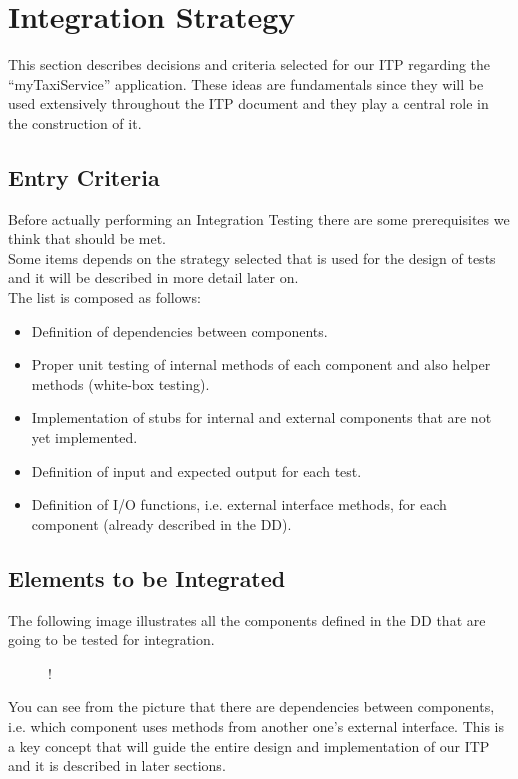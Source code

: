 \break
\section{Integration Strategy}
This section describes decisions and criteria selected for our ITP regarding the ``myTaxiService'' application. These ideas are fundamentals since they will be used extensively throughout the ITP document and they play a central role in the construction of it.
\subsection{Entry Criteria}
Before actually performing an Integration Testing there are some prerequisites we think that should be met. \\ Some items depends on the strategy selected that is used for the design of tests and it will be described in more detail later on. \\
The list is composed as follows:
\begin{itemize}
	\item Definition of dependencies between components.
	\item Proper unit testing of internal methods of each component and also helper methods (white-box testing).
	\item Implementation of stubs for internal and external components that are not yet implemented.
	\item Definition of input and expected output for each test.
	\item Definition of I/O functions, i.e. external interface methods, for each component (already described in the DD).
\end{itemize} 
\subsection{Elements to be Integrated}
The following image illustrates all the components defined in the DD that are going to be tested for integration.
\begin{figure}[H]
	\centering
	\resizebox{6in}
	{!}{}
\end{figure}
You can see from the picture that there are dependencies between components, i.e. which component uses methods from another one's external interface. This is a key concept that will guide the entire design and implementation of our ITP and it is described in later sections.
